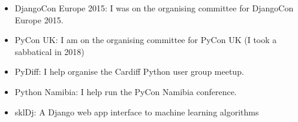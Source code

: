 \documentclass[10pt]{res} %
\begin{document}
\begin{resume}
\begin{itemize}
    \item DjangoCon Europe 2015: I was on the organising committee for DjangoCon Europe 2015.

    \item PyCon UK: I am on the organising committee for PyCon UK (I took a sabbatical in 2018)

    \item PyDiff: I help organise the Cardiff Python user group meetup.

    \item Python Namibia: I help run the PyCon Namibia conference.

    \item sklDj: A Django web app interface to machine learning algorithms

\end{itemize}

\end{resume}
\end{document}
